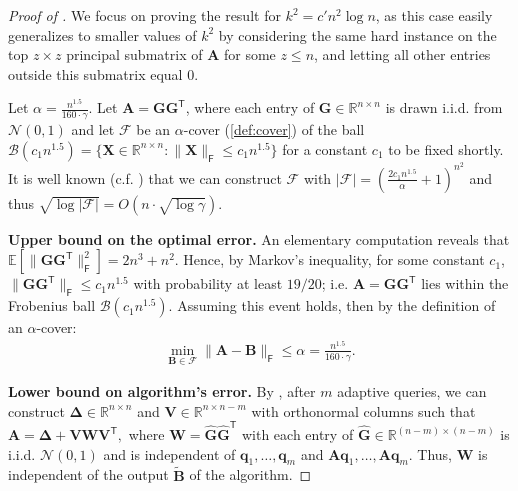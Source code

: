 \documentclass{article}[11pt]
\theoremstyle{definition}
\newcommand{\E}{\mathbb{E}}
\newcommand{\bv}[1]{\boldsymbol{\mathbf{#1}}}
\newcommand{\R}{\mathbb{R}}
\newcommand{\T}{\mathsf{T}}
\newcommand{\Fro}{\mathsf{F}}
\newcommand{\F}{\mathcal{F}}
\begin{document}
\begin{proof}[Proof of ] 
We focus on proving the result for $k^2 = c'n^2\log n$, as this case easily generalizes to smaller values of $k^2$ by considering the same hard instance on the top $z \times z$ principal submatrix of $\bv A$ for some $z \le n$, and letting all other entries outside this submatrix equal $0$.

Let $\alpha= \frac{n^{1.5}}{160 \cdot \gamma}$.
Let $\bv A= \bv G \bv G^\T$, where each entry of $\bv{G} \in \mathbb{R}^{n\times n}$ is drawn i.i.d. from $\mathcal{N}(0, 1)$ and let $\F$ be an $\alpha$-cover (\cref{def:cover}) of the ball $\mathcal{B}(c_1 n^{1.5}) = \{\bv X \in \R^{n\times n} : \|\bv X\|_{\Fro} \le c_1 n^{1.5}\}$ for a constant $c_1$ to be fixed shortly. It is well known (c.f. \cite[Corollary 4.2.13]{Vershynin2018}) that we can construct $\mathcal F$ with $|\mathcal F| = \left (\frac{2 c_1n^{1.5}}{\alpha} +1\right )^{n^2}$ and thus $\sqrt{\log|\F|} = O(n \cdot \sqrt{\log \gamma})$. 

\smallskip

\noindent \textbf{Upper bound on the optimal error.}
An elementary computation reveals that $\E[\|\bv G\bv G^\T\|_\Fro^2] = 2n^3 + n^2 $.
Hence, by Markov's inequality, for some constant $c_1$, $\|\bv G\bv G^\T\|_\Fro \leq c_1n^{1.5}$ with probability at least $19/20$; i.e. $\bv A=\bv G\bv G^\T$ lies within the Frobenius ball $\mathcal{B}(c_1 n^{1.5})$.
Assuming this event holds, then by the definition of an $\alpha$-cover:
\begin{align}\label{eq:upper2}
    \min_{\bv B \in \F} \|\bv A - \bv B\|_\Fro \le \alpha = \frac{n^{1.5}}{160 \cdot \gamma}.
\end{align}

\smallskip

\noindent \textbf{Lower bound on algorithm's error.}
By , after $m$ adaptive queries, we can construct $\bv{\Delta}\in \mathbb{R}^{n\times n}$ and $\bv{V} \in \mathbb{R}^{n\times n-m}$ with orthonormal columns such that
    $\bv A= \bv{\Delta}+\bv{V}\bv{W}\bv{V}^\T,$
    where $\bv{W}=\widehat{\bv{G}}\widehat{\bv{G}}^\T$ with each entry of $\widehat{\bv{G}} \in \mathbb{R}^{(n-m) \times (n-m)}$ is i.i.d. $ \mathcal N(0,1)$ and is independent of $\bv{q}_1,\ldots,\bv q_m$ and $\bv A \bv q_1,\ldots,\bv A \bv q_m$. Thus, $\bv W$ is independent of the output $\bv{\tilde B}$ of the algorithm.
    

\end{proof}
\end{document}
